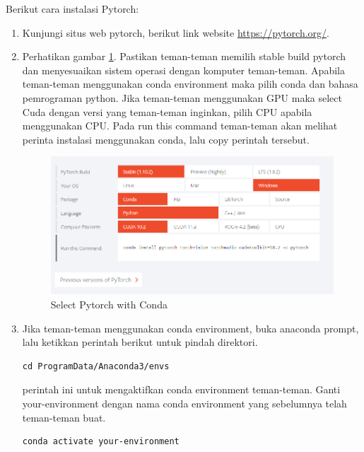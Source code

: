 Berikut cara instalasi Pytorch:
\begin{enumerate}
\item Kunjungi situs web pytorch, berikut link website \url{https://pytorch.org/}.
\item Perhatikan gambar \ref{pytorch1}. Pastikan teman-teman memilih stable build pytorch dan menyesuaikan sistem operasi dengan komputer teman-teman. Apabila teman-teman menggunakan conda environment maka pilih conda dan bahasa pemrograman python. Jika teman-teman menggunakan GPU maka select Cuda dengan versi yang teman-teman inginkan, pilih CPU apabila menggunakan CPU. Pada run this command teman-teman akan melihat perinta instalasi menggunakan conda, lalu copy perintah tersebut.
\begin{figure}[H]
\centering
\includegraphics[scale=.35]{figures/pytorch1}
\caption{Select Pytorch with Conda}
\label{pytorch1}
\end{figure}

\item Jika teman-teman menggunakan conda environment, buka anaconda prompt, lalu ketikkan perintah berikut untuk pindah direktori.
\begin{verbatim}
cd ProgramData/Anaconda3/envs
\end{verbatim}
perintah ini untuk mengaktifkan conda environment teman-teman. Ganti your-environment dengan nama conda environment yang sebelumnya telah teman-teman buat.
\begin{verbatim}
conda activate your-environment
\end{verbatim}


\end{enumerate}
